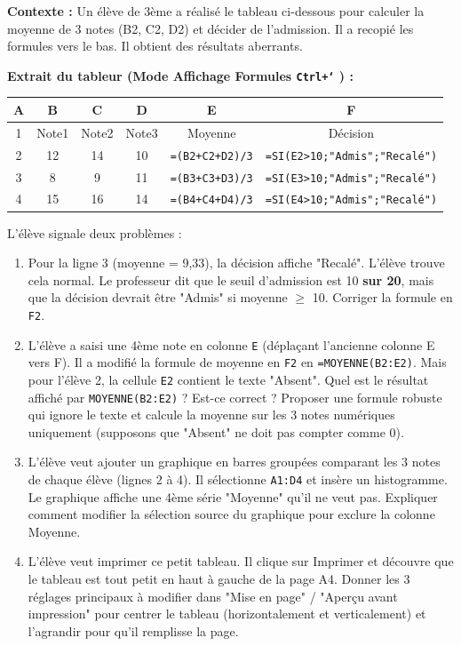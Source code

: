 \documentclass[11pt]{article}
\begin{document}
\begin{exercice}
\textbf{Contexte :} Un élève de 3ème a réalisé le tableau ci-dessous pour calculer la moyenne de 3 notes (B2, C2, D2) et décider de l'admission. Il a recopié les formules vers le bas. Il obtient des résultats aberrants.

\textbf{Extrait du tableur (Mode Affichage Formules \texttt{Ctrl+`} ) :}
\begin{center}
\begin{tabular}{|c|c|c|c|c|c|}
\hline
\textbf{A} & \textbf{B} & \textbf{C} & \textbf{D} & \textbf{E} & \textbf{F} \\ \hline
1 & Note1 & Note2 & Note3 & Moyenne & Décision \\ \hline
2 & 12 & 14 & 10 & \texttt{=(B2+C2+D2)/3} & \texttt{=SI(E2>10;"Admis";"Recalé")} \\ \hline
3 & 8 & 9 & 11 & \texttt{=(B3+C3+D3)/3} & \texttt{=SI(E3>10;"Admis";"Recalé")} \\ \hline
4 & 15 & 16 & 14 & \texttt{=(B4+C4+D4)/3} & \texttt{=SI(E4>10;"Admis";"Recalé")} \\ \hline
\end{tabular}
\end{center}

L'élève signale deux problèmes :
\begin{enumerate}
    \item Pour la ligne 3 (moyenne = 9,33), la décision affiche "Recalé". L'élève trouve cela normal. Le professeur dit que le seuil d'admission est 10 \textbf{sur 20}, mais que la décision devrait être "Admis" si moyenne $\ge$ 10. Corriger la formule en \texttt{F2}.
    \item L'élève a saisi une 4ème note en colonne \texttt{E} (déplaçant l'ancienne colonne E vers F). Il a modifié la formule de moyenne en \texttt{F2} en \texttt{=MOYENNE(B2:E2)}. Mais pour l'élève 2, la cellule \texttt{E2} contient le texte "Absent". Quel est le résultat affiché par \texttt{MOYENNE(B2:E2)} ? Est-ce correct ? Proposer une formule robuste qui ignore le texte et calcule la moyenne sur les 3 notes numériques uniquement (supposons que "Absent" ne doit pas compter comme 0).
    \item L'élève veut ajouter un graphique en barres groupées comparant les 3 notes de chaque élève (lignes 2 à 4). Il sélectionne \texttt{A1:D4} et insère un histogramme. Le graphique affiche une 4ème série "Moyenne" qu'il ne veut pas. Expliquer comment modifier la sélection source du graphique pour exclure la colonne Moyenne.
    \item L'élève veut imprimer ce petit tableau. Il clique sur Imprimer et découvre que le tableau est tout petit en haut à gauche de la page A4. Donner les 3 réglages principaux à modifier dans "Mise en page" / "Aperçu avant impression" pour centrer le tableau (horizontalement et verticalement) et l'agrandir pour qu'il remplisse la page.
\end{enumerate}
\end{exercice}
\end{document}

